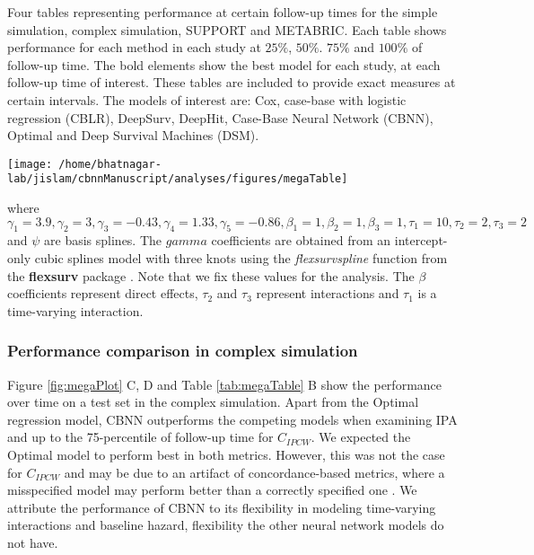 \documentclass[AMA,STIX1COL,]{WileyNJD-v2}
\begin{document}
\FloatBarrier
\begin{table}
\caption{Four tables representing performance at certain follow-up times for the simple simulation, complex simulation, SUPPORT and METABRIC. Each table shows performance for each method in each study at $25\%$, $50\%$. $75\%$ and $100\%$ of follow-up time. The bold elements show the best model for each study, at each follow-up time of interest. These tables are included to provide exact measures at certain intervals. The models of interest are: Cox, case-base with logistic regression (CBLR), DeepSurv, DeepHit, Case-Base Neural Network (CBNN), Optimal and Deep Survival Machines (DSM).}
\label{tab:megaTable}

\begin{center}\texttt{[image: /home/bhatnagar-lab/jislam/cbnnManuscript/analyses/figures/megaTable]} \end{center}

\end{table}
\FloatBarrier

where
\(\gamma_{1}=3.9, \gamma_{2}=3, \gamma_{3}=-0.43, \gamma_{4}=1.33,\gamma_{5}=-0.86, \beta_{{1}}=1, \beta_{{2}}=1, \beta_{{3}}=1, \tau_{1}=10, \tau_{2}=2, \tau_{3}=2\)
and \(\psi\) are basis splines. The \(gamma\) coefficients are obtained
from an intercept-only cubic splines model with three knots using the
\emph{flexsurvspline} function from the \textbf{flexsurv} package
\citep{flexsurv}. Note that we fix these values for the analysis. The
\(\beta\) coefficients represent direct effects, \(\tau_{2}\) and
\({\tau_3}\) represent interactions and \(\tau_{1}\) is a time-varying
interaction.

\hypertarget{performance-comparison-in-complex-simulation}{%
\subsubsection{Performance comparison in complex
simulation}\label{performance-comparison-in-complex-simulation}}

Figure \ref{fig:megaPlot} C, D and Table \ref{tab:megaTable} B show the
performance over time on a test set in the complex simulation. Apart
from the Optimal regression model, CBNN outperforms the competing models
when examining IPA and up to the 75-percentile of follow-up time for
\(C_{IPCW}\). We expected the Optimal model to perform best in both
metrics. However, this was not the case for \(C_{IPCW}\) and may be due
to an artifact of concordance-based metrics, where a misspecified model
may perform better than a correctly specified one
\citep{cindexfails2019}. We attribute the performance of CBNN to its
flexibility in modeling time-varying interactions and baseline hazard,
flexibility the other neural network models do not have.
\end{document}
